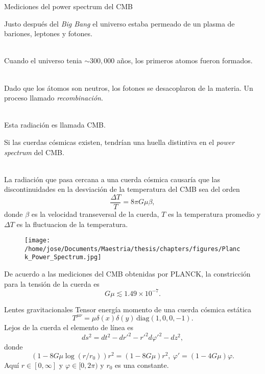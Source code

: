 \documentclass[14pt]{beamer}
\begin{document}
\begin{frame}{Mediciones del power spectrum del CMB}

Justo después del \textit{Big Bang} el universo estaba permeado de un plasma de bariones, leptones y fotones.\\~\

Cuando el universo tenia $\sim 300,000$ años, los primeros atomos fueron formados. \\~\

Dado que los átomos son neutros, los fotones se desacoplaron de la materia. Un proceso llamado \textit{recombinación}.\\~\

Esta radiación es llamada CMB.

\end{frame}

\begin{frame}
	Si las cuerdas cósmicas existen, tendrían una huella distintiva en el \textit{power spectrum} del CMB.\\~\
	
La radiación que pasa cercana a una cuerda cósmica causaría que las discontinuidades en la desviación de la temperatura del CMB sea del orden
\begin{equation*}
	\frac{\Delta T}{T} = 8\pi G \mu \beta,
\end{equation*}	
	donde $\beta$ es la velocidad transeversal de la cuerda, $T$ es la temperatura promedio y $\Delta T$ es la fluctuacion de la temperatura.
\end{frame}

\begin{frame}
\begin{figure}
	\centering
	\texttt{[image: /home/jose/Documents/Maestria/thesis/chapters/figures/Planck\_Power\_Spectrum.jpg]}
\end{figure}
\end{frame}


\begin{frame}
De acuerdo a las mediciones del CMB obtenidas por PLANCK, la constricción para la tensión de la cuerda es
\begin{equation*}
G\mu \lesssim 1.49\times 10^{-7}.
\end{equation*}
\end{frame}


\begin{frame}{Lentes gravitacionales}
Tensor energía momento de una cuerda cósmica estática
\begin{equation*}
	T^{\mu\nu} = \mu\delta(x)\delta(y)\,\text{diag}(1,0,0,-1).
	\label{eq:energytensor}
\end{equation*}
Lejos de la cuerda el elemento de línea es
\begin{equation*}
	ds^2 = dt^2-dr'^2-r'^2d\varphi'^2-dz^2,
	\label{eq:metric}
\end{equation*}
donde 
\begin{equation*}
(1-8G\mu\log(r/r_0))r^2 = (1-8G\mu)r^2,  \ \varphi' = (1-4G\mu)\varphi.
\end{equation*}
Aquí $r\in [0,\infty] $ y $\varphi\in[0,2\pi)$ y $r_0$ es una constante.
\end{frame}
\end{document}
